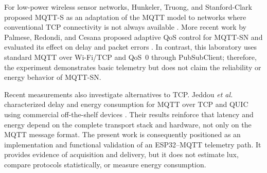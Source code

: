 For low-power wireless sensor networks, Hunkeler, Truong, and
Stanford-Clark proposed MQTT-S as an adaptation of the MQTT model to
networks where conventional TCP connectivity is not always available
\cite{mqtts}. More recent work by Palmese, Redondi, and Cesana proposed
adaptive QoS control for MQTT-SN and evaluated its effect on delay and
packet errors \cite{palmese2022}. In contrast, this laboratory uses
standard MQTT over Wi-Fi/TCP and QoS~0 through PubSubClient; therefore,
the experiment demonstrates basic telemetry but does not claim the
reliability or energy behavior of MQTT-SN.

Recent measurements also investigate alternatives to TCP. Jeddou \emph{et al.}
characterized delay and energy consumption for MQTT over TCP and
QUIC using commercial off-the-shelf devices \cite{jeddou2022}. Their
results reinforce that latency and energy depend on the complete
transport stack and hardware, not only on the MQTT message format. The
present work is consequently positioned as an implementation and
functional validation of an ESP32--MQTT telemetry path. It provides
evidence of acquisition and delivery, but it does not estimate lux,
compare protocols statistically, or measure energy consumption.

